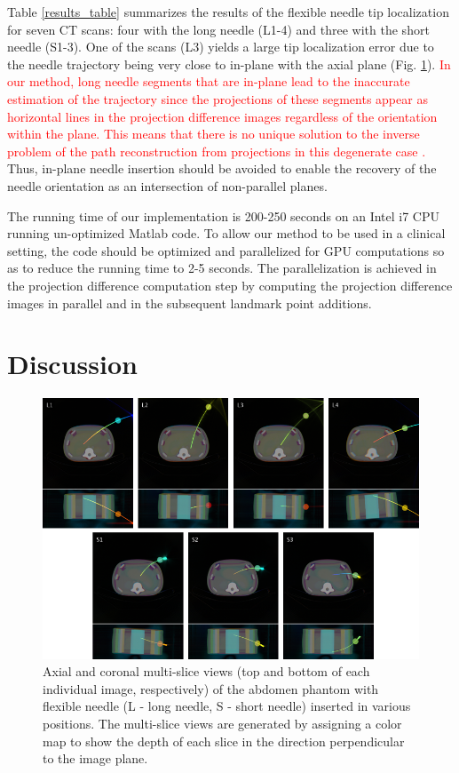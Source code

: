 Table \ref{results_table} summarizes the results of the flexible needle tip localization for seven CT scans: four with the long needle (L1-4) and three with the short needle (S1-3). One of the scans (L3) yields a large tip localization error due to the needle trajectory being very close to in-plane with the axial plane (Fig. \ref{multislices_fig}). \textcolor{red}{In our method, long needle segments that are in-plane lead to the inaccurate estimation of the trajectory since the projections of these segments appear as horizontal lines in the projection difference images regardless of the orientation within the plane. This means that there is no unique solution to the inverse problem of the path reconstruction from projections in this degenerate case \cite{medan2017reduced}.} Thus, in-plane needle insertion should be avoided to enable the recovery of the needle orientation as an intersection of non-parallel planes.

The running time of our implementation is 200-250 seconds on an Intel i7 CPU running un-optimized Matlab code. To allow our method to be used in a clinical setting, the code should be optimized and parallelized for GPU computations so as to reduce the running time to 2-5 seconds. The parallelization is achieved in the projection difference computation step by computing the projection difference images in parallel and in the subsequent landmark point additions.  

\section*{Discussion}

\begin{figure}[t]
\centering
\includegraphics[width=\textwidth]{multislices.png}
\caption{Axial and coronal multi-slice views (top and bottom of each individual image, respectively) of the abdomen phantom with flexible needle (L - long needle, S - short needle) inserted in various positions. The multi-slice views are generated by assigning a color map to show the depth of each slice in the direction perpendicular to the image plane.}
\label{multislices_fig}
\end{figure}

